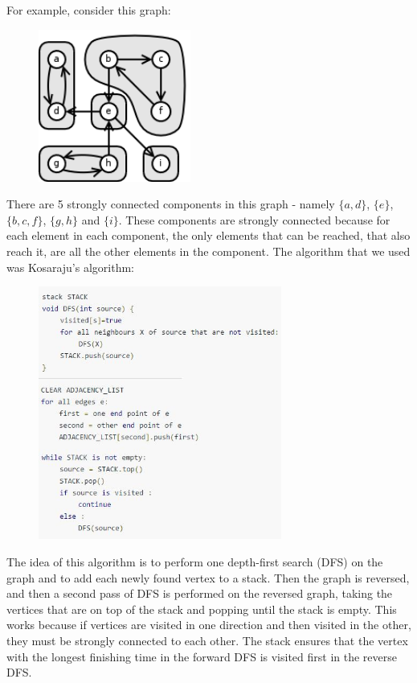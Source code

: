 \documentclass[11pt]{article}
\begin{document}
	For example, consider this graph:
	\begin{figure}[h!]
		\centering
		\includegraphics[width=50mm,scale=0.5]{images/SCC.jpg}
	\end{figure}
	\newline
	There are 5 strongly connected components in this graph - namely \(\{a,d\}\), \(\{e\}\), \(\{b,c,f\}\), \(\{g,h\}\) and \(\{i\}\). These components are strongly connected because for each element in each component, the only elements that can be reached, that also reach it, are all the other elements in the component. 
	The algorithm that we used was Kosaraju's algorithm: \cite{scc}
	\begin{figure}[h!]
		\centering
		\includegraphics[width=80mm,scale=0.5]{images/kosaraju.jpg}
	\end{figure}
	\newline
	The idea of this algorithm is to perform one depth-first search (DFS) on the graph and to add each newly found vertex to a stack. Then the graph is reversed, and then a second pass of DFS is performed on the reversed graph, taking the vertices that are on top of the stack and popping until the stack is empty. This works because if vertices are visited in one direction and then visited in the other, they must be strongly connected to each other. The stack ensures that the vertex with the longest finishing time in the forward DFS is visited first in the reverse DFS.
\end{document}
